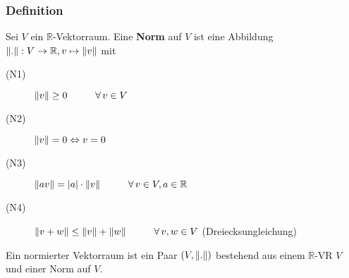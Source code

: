 \subsubsection[Norm]{Definition} %
\label{ssub:definition}
Sei $ V$ ein $\mathbb{R} $-Vektorraum. Eine {\bfseries Norm} auf $ V$ ist eine Abbildung $\norm{.}:V \to \mathbb{R} , v \mapsto \norm{v}$ mit
\begin{description}
	\item[(N1)]$\norm{v} \geq 0 \hspace{1cm} \forall \, v \in V$ 
	\item[(N2)] $\norm{v}=0 \Leftrightarrow v=0$
	\item[(N3)] $\norm{av}=|a|\cdot \norm{v} \hspace{1cm}  \forall\,v \in V, a \in \mathbb{R}$
	\item[(N4)] $\norm{v+w} \leq \norm{v}+\norm{w} \hspace{1cm} \forall\, v,w \in V$ \hspace{1cm} (Dreiecksungleichung) 
\end{description} 
Ein normierter Vektorraum ist ein Paar $(V,\norm{.})$ bestehend aus einem $\mathbb{R}$-VR $ V$ und einer Norm auf $ V$.

